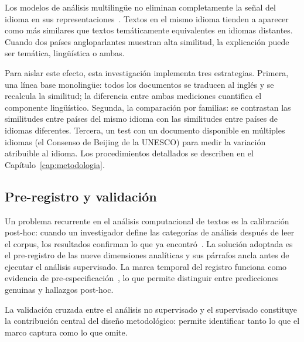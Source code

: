 Los modelos de análisis multilingüe no eliminan completamente la señal del idioma en sus representaciones~\citep{conneau2020unsupervised}. Textos en el mismo idioma tienden a aparecer como más similares que textos temáticamente equivalentes en idiomas distantes. Cuando dos países angloparlantes muestran alta similitud, la explicación puede ser temática, lingüística o ambas.

Para aislar este efecto, esta investigación implementa tres estrategias. Primera, una línea base monolingüe: todos los documentos se traducen al inglés y se recalcula la similitud; la diferencia entre ambas mediciones cuantifica el componente lingüístico. Segunda, la comparación por familias: se contrastan las similitudes entre países del mismo idioma con las similitudes entre países de idiomas diferentes. Tercera, un test con un documento disponible en múltiples idiomas (el Consenso de Beijing de la UNESCO) para medir la variación atribuible al idioma. Los procedimientos detallados se describen en el Capítulo~\ref{cap:metodologia}.


\subsection{Pre-registro y validación}

Un problema recurrente en el análisis computacional de textos es la calibración post-hoc: cuando un investigador define las categorías de análisis después de leer el corpus, los resultados confirman lo que ya encontró~\citep{grimmer2013text}. La solución adoptada es el pre-registro de las nueve dimensiones analíticas y sus párrafos ancla antes de ejecutar el análisis supervisado. La marca temporal del registro funciona como evidencia de pre-especificación~\citep{nosek2018preregistration}, lo que permite distinguir entre predicciones genuinas y hallazgos post-hoc.

La validación cruzada entre el análisis no supervisado y el supervisado constituye la contribución central del diseño metodológico: permite identificar tanto lo que el marco captura como lo que omite.
